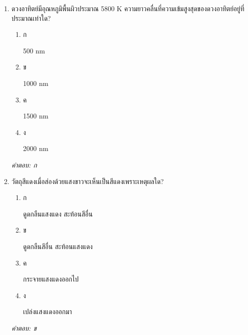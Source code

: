 \documentclass[12pt]{article}
\begin{document}
\begin{enumerate}[label=\arabic*., itemsep=0.5\baselineskip, topsep=0.5\baselineskip, leftmargin=*]
\item ดวงอาทิตย์มีอุณหภูมิพื้นผิวประมาณ 5800 K ความยาวคลื่นที่ความเข้มสูงสุดของดวงอาทิตย์อยู่ที่ประมาณเท่าใด?
\begin{enumerate}[label=\alph*)., itemsep=0.3\baselineskip, topsep=0.3\baselineskip]
\item ก\ 
\begin{minipage}[t]{0.9\linewidth}
\raggedright 500 nm
\end{minipage}
\item ข\ 
\begin{minipage}[t]{0.9\linewidth}
\raggedright 1000 nm
\end{minipage}
\item ค\ 
\begin{minipage}[t]{0.9\linewidth}
\raggedright 1500 nm
\end{minipage}
\item ง\ 
\begin{minipage}[t]{0.9\linewidth}
\raggedright 2000 nm
\end{minipage}
\end{enumerate}
\vspace{-0.3\baselineskip}
\begin{small}
\textit{คำตอบ: ก}
\end{small}

\item วัตถุสีแดงเมื่อส่องด้วยแสงขาวจะเห็นเป็นสีแดงเพราะเหตุผลใด?
\begin{enumerate}[label=\alph*)., itemsep=0.3\baselineskip, topsep=0.3\baselineskip]
\item ก\ 
\begin{minipage}[t]{0.9\linewidth}
\raggedright ดูดกลืนแสงแดง สะท้อนสีอื่น
\end{minipage}
\item ข\ 
\begin{minipage}[t]{0.9\linewidth}
\raggedright ดูดกลืนสีอื่น สะท้อนแสงแดง
\end{minipage}
\item ค\ 
\begin{minipage}[t]{0.9\linewidth}
\raggedright กระจายแสงแดงออกไป
\end{minipage}
\item ง\ 
\begin{minipage}[t]{0.9\linewidth}
\raggedright เปล่งแสงแดงออกมา
\end{minipage}
\end{enumerate}
\vspace{-0.3\baselineskip}
\begin{small}
\textit{คำตอบ: ข}
\end{small}


\end{enumerate}
\end{document}
